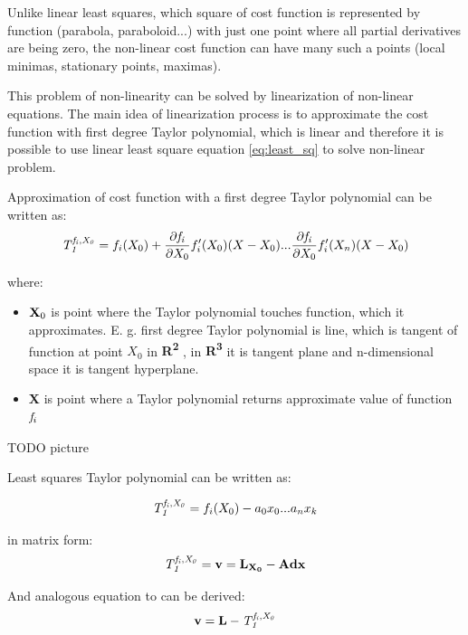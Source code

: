 \documentclass[a4paper,12pt]{article}
\newcommand{\ematr}[1]{
{\bf #1}
}
\newcommand{\evect}[1]{
{\bf #1}
}
\newcommand{\eucl}[1]{
{\bf R\textsuperscript{#1}}
}
\newcommand{\efunc}[1]{
{\it #1}
}
\begin{document}
Unlike linear least squares, which square of cost function is represented by function  (parabola, paraboloid...) with just one point where all
partial derivatives are being zero, the non-linear cost function can have many such a points (local minimas, stationary points, maximas). 

This problem of non-linearity can be solved by linearization of non-linear equations.
The main idea of linearization process is to approximate the cost function with first degree Taylor polynomial,
which is linear and therefore it is possible to use linear least square equation \eqref{eq:least_sq} 
to solve non-linear problem. 

Approximation of cost function with a first degree Taylor polynomial can be written as:
\begin{equation}
\efunc{T^{f_{i}, X_{0}}_{1}} = f_{i}(X_{0}) + \frac{\partial \efunc{f_{i}}}{\partial {X_{0}}} f_{i}'(X_{0}) (X -  X_{0}) 
... \frac{\partial \efunc{f_{i}}}{\partial {X_{0}}} f_{i}'(X_{n}) (X -  X_{0}) 
\end{equation}

where:
\begin{itemize}
\item $\evect{X}_{0}$ is point where the Taylor polynomial touches function, which it approximates. E. g. first degree Taylor polynomial 
      is line, which is tangent of function at point $X_{0}$ in \eucl{2}, in \eucl{3} it is tangent plane and n-dimensional 
      space it is tangent hyperplane.
\item \evect{X} is point where a Taylor polynomial returns approximate value of function $\efunc{f}_{i}$
\end{itemize}

TODO picture 

Least squares Taylor polynomial can be written as:

\begin{equation}
\efunc{T^{f_{i}, X_{0}}_{1}} = f_{i}(X_{0}) - a_{0} x_{0} ... a_{n} x_{k} 
\end{equation} 

in matrix form:
\begin{equation}
\efunc{T^{f_{i}, X_{0}}_{1}} = \evect{v} = \evect{L_{X_{0}}} - \ematr{A}\evect{dx}
\end{equation} 

And analogous equation to \label{eq:least_v} can be derived:
\begin{equation}
\evect{v} = \evect{L} - \efunc{T^{f_{i}, X_{0}}_{1}}
\end{equation} 
 
\end{document}
